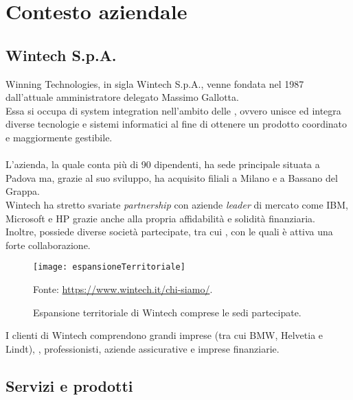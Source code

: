 \chapter{Contesto aziendale}
\label{cap:contestoAziendale}

\section{Wintech S.p.A.}
\noindent Winning Technologies, in sigla Wintech S.p.A., venne fondata nel 1987 dall'attuale amministratore delegato Massimo Gallotta.\\
Essa si occupa di \gls{system integration} nell'ambito delle , ovvero unisce ed integra diverse tecnologie e sistemi informatici al fine di ottenere un prodotto coordinato e maggiormente gestibile.\\\\
L'azienda, la quale conta più di 90 dipendenti, ha sede principale situata a Padova ma, grazie al suo sviluppo, ha acquisito filiali a Milano e a Bassano del Grappa.\\
Wintech ha stretto svariate \emph{partnership} con aziende \emph{leader} di mercato come IBM, Microsoft e HP grazie anche alla propria affidabilità e solidità finanziaria.\\ 
Inoltre, possiede diverse società partecipate, tra cui , con le quali è attiva una forte collaborazione.\\
\begin{figure}[htbp] 
    \centering 
    \texttt{[image: espansioneTerritoriale]} 
    \caption{Espansione territoriale di Wintech comprese le sedi partecipate.}
    \label{fig:espansioneTerritoriale}
    \vspace{1mm}
    Fonte: \url{https://www.wintech.it/chi-siamo/}.
\end{figure}
\noindent I clienti di Wintech comprendono grandi imprese (tra cui BMW, Helvetia e Lindt), , professionisti, aziende assicurative e imprese finanziarie.\\

\section{Servizi e prodotti}
